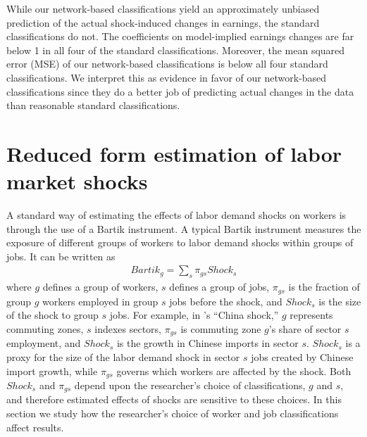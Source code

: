 \documentclass[12pt]{article}
\theoremstyle{definition}
\theoremstyle{plain}
\begin{document}
While our network-based classifications yield an approximately unbiased prediction of the actual shock-induced changes in earnings, the standard classifications do not. The coefficients on model-implied earnings changes are far below 1 in all four of the standard classifications. Moreover, the mean squared error (MSE) of our network-based classifications is below all four standard classifications. We interpret this as evidence in favor of our network-based classifications since they do a better job of predicting actual changes in the data than reasonable standard classifications.


\section{Reduced form estimation of labor market shocks} 

\label{sec:reduced_form}



A standard way of estimating the effects of labor demand shocks on workers is through the use of a Bartik instrument. A typical Bartik instrument measures the exposure of different groups of workers to labor demand shocks within groups of jobs. It can be written as 
\begin{align}
	Bartik_{g} = \sum_s \pi_{g s} Shock_s \label{eq:bartik}
\end{align}
where $g$ defines a group of workers, $s$ defines a group of jobs, $\pi_{gs}$ is the fraction of group $g$ workers employed in group $s$ jobs before the shock, and $Shock_s$ is the size of the shock to group $s$ jobs. For example, in \citeauthor{AutorDornHanson2013}'s ``China shock,'' $g$ represents commuting zones, $s$ indexes sectors, $\pi_{gs}$ is commuting zone $g$'s share of sector $s$ employment, and $Shock_s$ is the growth in Chinese imports in sector $s$. $Shock_s$ is a proxy for the size of the labor demand shock in sector $s$ jobs created by Chinese import growth, while $\pi_{gs}$ governs which workers are affected by the shock. Both $Shock_s$ and $\pi_{gs}$ depend upon the researcher's choice of classifications, $g$ and $s$, and therefore estimated effects of shocks are sensitive to these choices. In this section we study how the researcher's choice of worker and job classifications affect results. 
\end{document}
